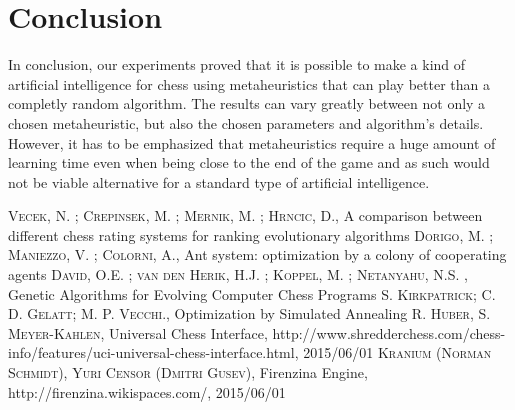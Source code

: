 \documentclass[pdftex]{article}
\begin{document}
\section{Conclusion}
\label{sec:conclusion}

In conclusion, our experiments proved that it is possible to make a kind of artificial intelligence for chess using metaheuristics that can play better than a completly random algorithm. The results can vary greatly between not only a chosen metaheuristic, but also the chosen parameters and algorithm's details. However, it has to be emphasized that metaheuristics require a huge amount of learning time even when being close to the end of the game and as such would not be viable alternative for a standard type of artificial intelligence.

\begin{thebibliography}{99}

 \textsc{Vecek, N. ; Crepinsek, M. ; Mernik, M. ; Hrncic, D.}, A comparison between different chess rating systems for ranking evolutionary algorithms 
 \textsc{Dorigo, M. ; Maniezzo, V. ; Colorni, A.}, Ant system: optimization by a colony of cooperating agents 
 \textsc{David, O.E. ; van den Herik, H.J. ; Koppel, M. ; Netanyahu, N.S. }, Genetic Algorithms for Evolving Computer Chess Programs 
 \textsc{S. Kirkpatrick; C. D. Gelatt; M. P. Vecchi.}, Optimization by Simulated Annealing 
 \textsc{R. Huber, S. Meyer-Kahlen}, Universal Chess Interface, http://www.shredderchess.com/chess-info/features/uci-universal-chess-interface.html, 2015/06/01
 \textsc{Kranium (Norman Schmidt), Yuri Censor (Dmitri Gusev)}, Firenzina Engine, http://firenzina.wikispaces.com/, 2015/06/01

\end{thebibliography}
\end{document}
